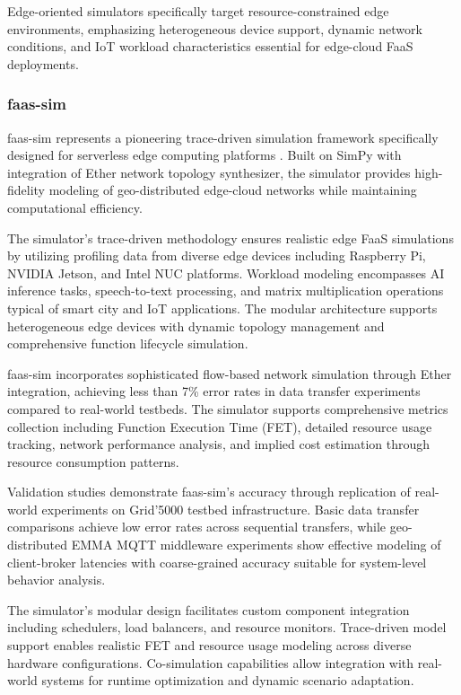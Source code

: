 Edge-oriented simulators specifically target resource-constrained edge environments, emphasizing heterogeneous device support, dynamic network conditions, and IoT workload characteristics essential for edge-cloud FaaS deployments.

\subsubsection{faas-sim}

faas-sim represents a pioneering trace-driven simulation framework specifically designed for serverless edge computing platforms \cite{boughzala2022faassim}. Built on SimPy with integration of Ether network topology synthesizer, the simulator provides high-fidelity modeling of geo-distributed edge-cloud networks while maintaining computational efficiency.

The simulator's trace-driven methodology ensures realistic edge FaaS simulations by utilizing profiling data from diverse edge devices including Raspberry Pi, NVIDIA Jetson, and Intel NUC platforms. Workload modeling encompasses AI inference tasks, speech-to-text processing, and matrix multiplication operations typical of smart city and IoT applications. The modular architecture supports heterogeneous edge devices with dynamic topology management and comprehensive function lifecycle simulation.

faas-sim incorporates sophisticated flow-based network simulation through Ether integration, achieving less than 7\% error rates in data transfer experiments compared to real-world testbeds. The simulator supports comprehensive metrics collection including Function Execution Time (FET), detailed resource usage tracking, network performance analysis, and implied cost estimation through resource consumption patterns.

Validation studies demonstrate faas-sim's accuracy through replication of real-world experiments on Grid'5000 testbed infrastructure. Basic data transfer comparisons achieve low error rates across sequential transfers, while geo-distributed EMMA MQTT middleware experiments show effective modeling of client-broker latencies with coarse-grained accuracy suitable for system-level behavior analysis.

The simulator's modular design facilitates custom component integration including schedulers, load balancers, and resource monitors. Trace-driven model support enables realistic FET and resource usage modeling across diverse hardware configurations. Co-simulation capabilities allow integration with real-world systems for runtime optimization and dynamic scenario adaptation.

